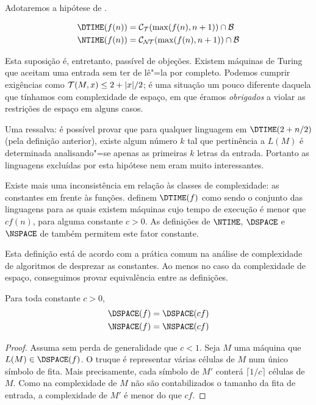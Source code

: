 Adotaremos a hipótese de .
\begin{definition}
    \begin{align*}
        \DTIME(f(n)) &= \mathcal C_\PhiDT(\max(f(n), n+1)) \cap \mathcal B \\
        \NTIME(f(n)) &= \mathcal C_\PhiNT(\max(f(n), n+1)) \cap \mathcal B
    \end{align*}
\end{definition}

Esta suposição é,
entretanto,
passível de objeções.
Existem máquinas de Turing
que aceitam uma entrada
sem ter de lê"=la por completo.
Podemos cumprir exigências como
${\mathcal{T}}(M, x) \leq 2 + |x|/2$;
é uma situação um pouco diferente
daquela que tínhamos com complexidade de espaço,
em que éramos \emph{obrigados}
a violar as restrições de espaço
em alguns casos.

Uma ressalva:
é possível provar que
para qualquer linguagem em $\DTIME(2 + n/2)$
(pela definição anterior),
existe algum número $k$ tal que
pertinência a $L(M)$
é determinada analisando"=se
apenas as primeiras $k$ letras da entrada.
Portanto as linguagens excluídas por esta hipótese
nem eram muito interessantes.

Existe mais uma inconsistência
em relação às classes de complexidade:
as constantes em frente às funções.
definem $\DTIME(f)$ como sendo o conjunto das linguagens
para as quais existem máquinas cujo tempo de execução
é menor que $c f(n)$, para alguma constante $c > 0$.
As definições de $\NTIME$, $\DSPACE$ e $\NSPACE$
de 
também permitem este fator constante.

Esta definição está de acordo com
a prática comum na análise de complexidade de algoritmos
de desprezar as constantes.
Ao menos no caso da complexidade de espaço,
conseguimos provar equivalência entre as definições.

\begin{theorem}
    Para toda constante $c > 0$,
    \begin{align*}
        \DSPACE(f) & = \DSPACE(cf) \\
        \NSPACE(f) & = \NSPACE(cf)
    \end{align*}
\end{theorem}

\begin{proof}
    Assuma sem perda de generalidade que $c < 1$.
    Seja $M$ uma máquina que $L(M) \in \DSPACE(f)$.
    O truque é representar várias células de $M$
    num único símbolo de fita.
    Mais precisamente,
    cada símbolo de $M'$ conterá
    $\lceil 1/c \rceil$ células de $M$.
    Como na complexidade de $M$
    não são contabilizados o tamanho da fita de entrada,
    a complexidade de $M'$ é menor do que $cf$.
\end{proof}


